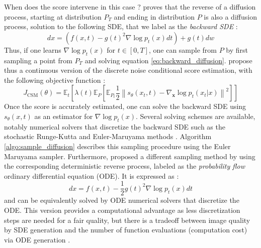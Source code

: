 When does the score intervene in this case ? \citep{ANDERSON1982313} proves that the reverse of a diffusion process, starting at distribution $P_{T}$ and ending in distribution $P$ is also a diffusion process, solution to the following SDE, that we label as the \textit{backward SDE} : 
\begin{equation}\label{eq:backward_diffusion}
    dx = \left(f(x,t) - g(t)^{2}\nabla \log p_{t}(x)dt\right) + g(t)dw
\end{equation}
Thus, if one learns $\nabla \log p_{t}(x)$ for $t \in [0,T]$, one can sample from $P$ by first sampling a point from $P_{T}$ and solving equation \ref{eq:backward_diffusion}.
\citep{song2021scorebasedgenerativemodelingstochastic} propose thus a continuous version of the discrete noise conditional score estimation, with the following objective function : 
\begin{equation}
    J_{\text{CSM}}(\theta) =\mathbb{E}_{t} \left[ \lambda(t) \mathbb{E}_{P} \left[ \mathbb{E}_{P_{t}} \frac{1}{2} \left\| s_{\theta}(x_{t},t) - \nabla_\mathbf{x} \log p_{t}(x_{t}|x) \right\|^2 \right]\right]
\end{equation}
Once the score is accurately estimated, one can solve the backward SDE using $s_{\theta}(x,t)$ as an estimator for $\nabla \log p_{t}(x)$. Several solving schemes are available, notably numerical solvers that discretize the backward SDE such as the stochastic Runge-Kutta and Euler-Maruyama methods \citep{kpj1992numerical}. Algorithm \ref{algo:sample_diffusion} describes this sampling procedure using the Euler Maruyama sampler. Furthermore, \citep{song2021scorebasedgenerativemodelingstochastic} proposed a different sampling method by using the corresponding deterministic reverse process, labeled as the \textit{probability flow} ordinary differential equation (ODE). It is expressed as : 
\begin{equation}\label{eq:backwatd_ode}
    dx = f(x,t) - \frac{1}{2}g(t)^{2}\nabla \log p_{t}(x)dt
\end{equation}
and can be equivalently solved by ODE numerical solvers that discretize the ODE. This version provides a computational advantage as less discretization steps are needed for a fair quality, but there is a tradeoff between image quality by SDE generation and the number of function evaluations (computation cost) via ODE generation \citep{xu_restart_2023}. 

